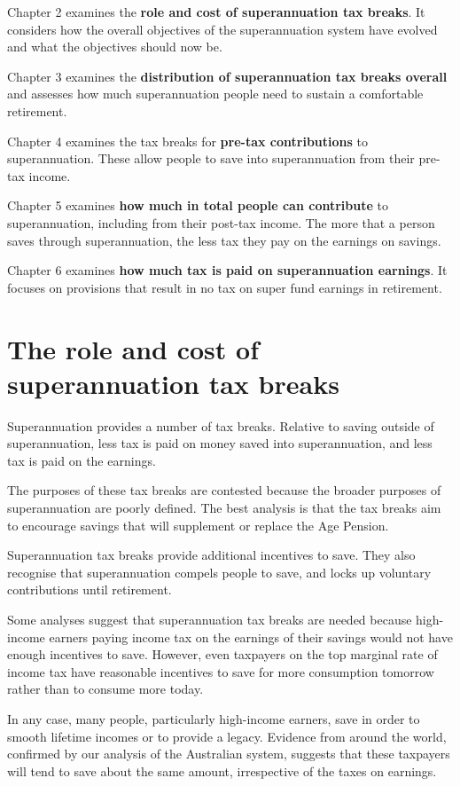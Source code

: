\documentclass{grattanAlpha}
\begin{document}
Chapter 2 examines the \textbf{role and cost of superannuation tax breaks}. It considers how the overall objectives of the superannuation system have evolved and what the objectives should now be.

Chapter 3 examines the \textbf{distribution of superannuation tax breaks overall} and assesses how much superannuation people need to sustain a comfortable retirement.  

Chapter 4 examines the tax breaks for \textbf{pre-tax contributions} to superannuation. These allow people to save into superannuation from their pre-tax income.

Chapter 5 examines \textbf{how much in total people can contribute} to superannuation, including from their post-tax income. The more that a person saves through superannuation, the less tax they pay on the earnings on savings.

Chapter 6 examines \textbf{how much tax is paid on superannuation earnings}. It focuses on provisions that result in no tax on super fund earnings in retirement.

\chapter{The role and cost of superannuation tax breaks}
Superannuation provides a number of tax breaks. Relative to saving outside of superannuation, less tax is paid on money saved into superannuation, and less tax is paid on the earnings.

The purposes of these tax breaks are contested because the broader purposes of superannuation are poorly defined. The best analysis is that the tax breaks aim to encourage savings that will supplement or replace the Age Pension. 

Superannuation tax breaks provide additional incentives to save. They also recognise that superannuation compels people to save, and locks up voluntary contributions until retirement.

Some analyses suggest that superannuation tax breaks are needed because high-income earners paying income tax on the earnings of their savings would not have enough incentives to save. However, even taxpayers on the top marginal rate of income tax have reasonable incentives to save for more consumption tomorrow rather than to consume more  today.

In any case, many people, particularly high-income earners, save in order to smooth lifetime incomes or to provide a legacy. Evidence from around the world, confirmed by our analysis of the Australian system, suggests that these taxpayers will tend to save about the same amount, irrespective of the taxes on earnings.
\end{document}
